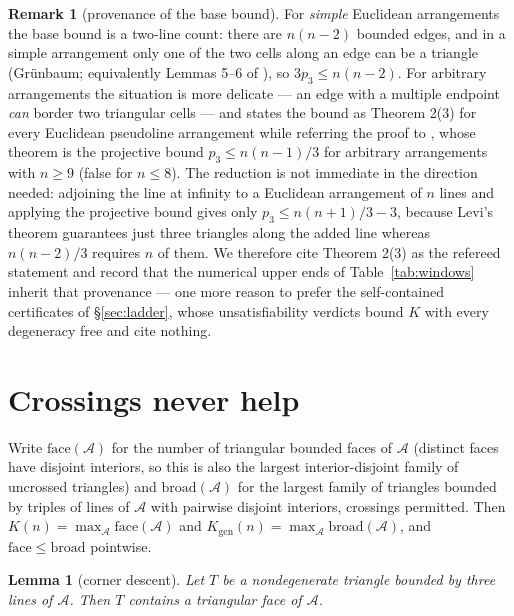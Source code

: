 \documentclass[11pt]{article}
\newtheorem{lemma}[theorem]{Lemma}
\theoremstyle{definition}
\newtheorem{remark}[theorem]{Remark}
\newcommand{\Kgen}{K_{\mathrm{gen}}}
\begin{document}
\begin{remark}[provenance of the base bound]\label{rem:provenance}
For \emph{simple} Euclidean arrangements the base bound is a two-line count:
there are $n(n-2)$ bounded edges, and in a simple arrangement only one of the
two cells along an edge can be a triangle (Grünbaum; equivalently
Lemmas 5--6 of \cite{FK1999}), so $3p_3\le n(n-2)$. For arbitrary
arrangements the situation is more delicate --- an edge with a multiple
endpoint \emph{can} border two triangular cells --- and \cite{FK1999} states
the bound as Theorem 2(3) for every Euclidean pseudoline arrangement while
referring the proof to \cite{Rou1996}, whose theorem is the projective bound
$p_3\le n(n-1)/3$ for arbitrary arrangements with $n\ge9$ (false for
$n\le8$). The reduction is not immediate in the direction needed: adjoining
the line at infinity to a Euclidean arrangement of $n$ lines and applying the
projective bound gives only $p_3\le n(n+1)/3-3$, because Levi's theorem
guarantees just three triangles along the added line whereas $n(n-2)/3$
requires $n$ of them. We therefore cite Theorem 2(3) as the refereed
statement and record that the numerical upper ends of
Table~\ref{tab:windows} inherit that provenance --- one more reason to prefer
the self-contained certificates of \S\ref{sec:ladder}, whose
unsatisfiability verdicts bound $K$ with every degeneracy free and cite
nothing.
\end{remark}

\section{Crossings never help}

Write $\mathrm{face}(\mathcal A)$ for the number of triangular bounded faces
of $\mathcal A$ (distinct faces have disjoint interiors, so this is also the
largest interior-disjoint family of uncrossed triangles) and
$\mathrm{broad}(\mathcal A)$ for the largest family of triangles bounded by
triples of lines of $\mathcal A$ with pairwise disjoint interiors, crossings
permitted. Then $K(n)=\max_{\mathcal A}\mathrm{face}(\mathcal A)$ and
$\Kgen(n)=\max_{\mathcal A}\mathrm{broad}(\mathcal A)$, and
$\mathrm{face}\le\mathrm{broad}$ pointwise.

\begin{lemma}[corner descent]\label{lem:descent}
Let $T$ be a nondegenerate triangle bounded by three lines of $\mathcal A$.
Then $T$ contains a triangular face of $\mathcal A$.
\end{lemma}
\end{document}
